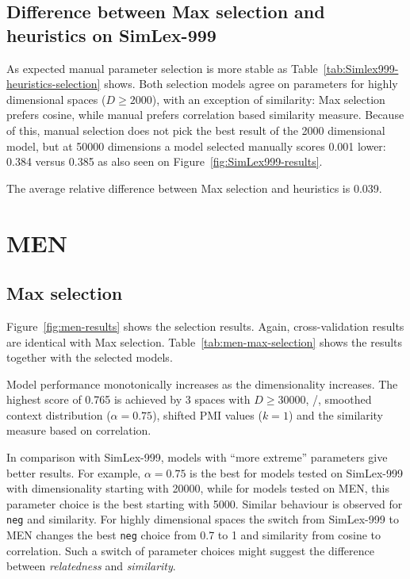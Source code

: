 
\subsection{Difference between Max selection and heuristics on SimLex-999}



As expected manual parameter selection is more stable as Table~\ref{tab:Simlex999-heuristics-selection} shows. Both selection models agree on parameters for highly dimensional spaces ($D \geq 2000$), with an exception of similarity: Max selection prefers cosine, while manual prefers correlation based similarity measure. Because of this, manual selection does not pick the best result of the 2000 dimensional model, but at 50000 dimensions  a model selected manually scores 0.001 lower: 0.384 versus 0.385 as also seen on Figure~\ref{fig:SimLex999-results}.

The average relative difference between Max selection and heuristics is 0.039.

\section{MEN}
\label{sec:men}

\subsection{Max selection}
\label{sec:max-selection-men}



Figure~\ref{fig:men-results} shows the selection results. Again, cross-validation results are identical with Max selection. Table~\ref{tab:men-max-selection} shows the results together with the selected models.



Model performance monotonically increases as the dimensionality increases. The highest score of 0.765 is achieved by 3 spaces with $D \geq 30000$, \logNSCPMI/, smoothed context distribution ($\alpha = 0.75$), shifted PMI values ($k = 1$) and the similarity measure based on correlation.

In comparison with SimLex-999, models with ``more extreme'' parameters give better results. For example, $\alpha = 0.75$ is the best for models tested on SimLex-999 with dimensionality starting with 20000, while for models tested on MEN, this parameter choice is the best starting with 5000. Similar behaviour is observed for \texttt{neg} and similarity. For highly dimensional spaces the switch from SimLex-999 to MEN changes the best \texttt{neg} choice from 0.7 to 1 and similarity from cosine to correlation. Such a switch of parameter choices might suggest the difference between \textit{relatedness} and \textit{similarity}.

